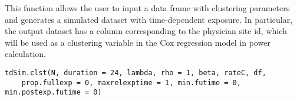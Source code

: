 \documentclass[a4paper]{book}
\begin{document}
%
\begin{Description}\relax

This function allows the user to input a data frame with clustering
parameters and generates a simulated dataset with time-dependent exposure.
In particular, the output dataset has a column corresponding to the physician site id, which will be used as a clustering variable in the Cox regression model in power calculation.
\end{Description}
%
\begin{Usage}
\begin{verbatim}
tdSim.clst(N, duration = 24, lambda, rho = 1, beta, rateC, df,
    prop.fullexp = 0, maxrelexptime = 1, min.futime = 0, min.postexp.futime = 0)
\end{verbatim}
\end{Usage}
%
\end{document}
